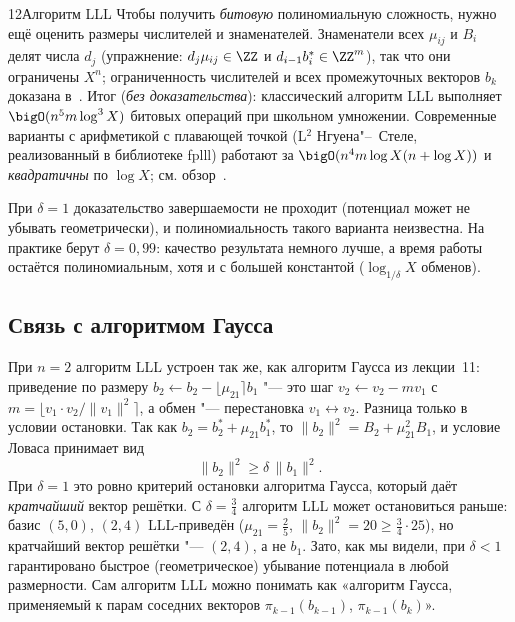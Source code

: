 \begin{lecture}{12}{Алгоритм LLL}
Чтобы получить \emph{битовую} полиномиальную сложность, нужно ещё оценить размеры
числителей и знаменателей. Знаменатели всех $\mu_{ij}$ и $B_i$ делят числа $d_j$
(упражнение: $d_{j}\mu_{ij} \in \ZZ$ и $d_{i-1} b_i^* \in \ZZ^m$), так что они ограничены
$X^{n}$; ограниченность числителей и всех промежуточных векторов $b_k$ доказана
в~\cite{lll}. Итог (\emph{без доказательства}): классический алгоритм LLL
выполняет $\bigO(n^5 m \log^3 X)$ битовых операций при школьном умножении. Современные
варианты с арифметикой с плавающей точкой (L$^2$ Нгуена"--~Стеле, реализованный в библиотеке
fplll) работают за $\bigO(n^4 m \log X (n + \log X))$ и \emph{квадратичны} по $\log X$; см.
обзор~\cite[гл.~5]{nguyen-vallee}.

\begin{remark}
При $\delta = 1$ доказательство завершаемости не проходит (потенциал может не убывать
геометрически), и полиномиальность такого варианта неизвестна. На практике берут
$\delta = 0{,}99$: качество результата немного лучше, а время работы остаётся
полиномиальным, хотя и с большей константой ($\log_{1/\delta} X$ обменов).
\end{remark}




\subsection{Связь с алгоритмом Гаусса}\label{l12:gauss}

При $n = 2$ алгоритм LLL устроен так же, как алгоритм Гаусса из лекции~11: приведение
по размеру $b_2 \gets b_2 - \lfloor \mu_{21} \rceil b_1$ "--- это шаг $v_2 \gets v_2 - m v_1$
с $m = \lfloor v_1 \cdot v_2 / \|v_1\|^2 \rceil$, а обмен "--- перестановка $v_1
\leftrightarrow v_2$. Разница только в условии остановки. Так как $b_2 = b_2^* + \mu_{21}
b_1^*$, то $\|b_2\|^2 = B_2 + \mu_{21}^2 B_1$, и условие Ловаса принимает вид
\[
  \|b_2\|^2 \ge \delta\, \|b_1\|^2 .
\]
При $\delta = 1$ это ровно критерий остановки алгоритма Гаусса, который даёт \emph{кратчайший}
вектор решётки. С $\delta = \frac34$ алгоритм LLL может остановиться раньше: базис $(5, 0)$,
$(2, 4)$ LLL-приведён ($\mu_{21} = \frac25$, $\|b_2\|^2 = 20 \ge \frac34 \cdot 25$), но
кратчайший вектор решётки "--- $(2, 4)$, а не $b_1$. Зато, как мы видели, при $\delta < 1$
гарантировано быстрое (геометрическое) убывание потенциала в любой размерности. Сам алгоритм
LLL можно понимать как «алгоритм Гаусса, применяемый к парам соседних векторов
$\pi_{k-1}(b_{k-1})$, $\pi_{k-1}(b_k)$».


\end{lecture}
